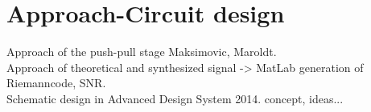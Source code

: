 \chapter{Approach-Circuit design}
Approach of the push-pull stage Maksimovic, Maroldt.\\
Approach of theoretical and synthesized signal -> MatLab generation of Riemanncode, SNR.\\
Schematic design in Advanced Design System 2014. concept, ideas... 

